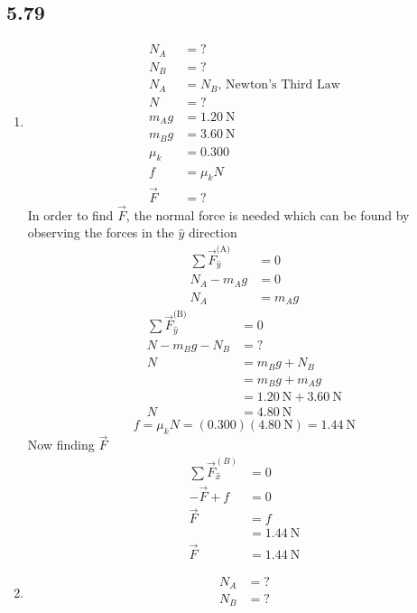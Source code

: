 \documentclass{article}
\begin{document}
\subsection{5.79}
\begin{enumerate}[label=\textbf{(\alph*)}]
	\item
		\begin{align*}
			N_A & = ? \\
			N_B & = ? \\
			N_A & = N_B \text{, Newton's Third Law} \\
			N & = ? \\
			m_Ag & = \SI{1.20}{\newton} \\
			m_Bg & = \SI{3.60}{\newton} \\
			\mu_k & = 0.300 \\
			f & = \mu_kN \\
			\vec{F} & = ?
		\end{align*}
		In order to find $ \vec{F} $, the normal force is needed which can be found by observing the forces in the $ \hat{y} $ direction
		\begin{align*}
			\sum \vec{F}_{\hat{y}}^\text{(A)} & = 0 \\
			N_A - m_Ag & = 0 \\
			N_A & = m_Ag
		\end{align*}
		\begin{align*}
			\sum \vec{F}_{\hat{y}}^\text{(B)} & = 0 \\
			N - m_Bg - N_B & = ? \\
			N & = m_Bg + N_B \\
			  & = m_Bg + m_Ag \\
			  & = \SI{1.20}{\newton} + \SI{3.60}{\newton} \\
			N & = \SI{4.80}{\newton}
		\end{align*}
		$$ f = \mu_kN = (0.300)(\SI{4.80}{\newton}) = \SI{1.44}{\newton} $$
		Now finding $ \vec{F} $
		\begin{align*}
			\sum \vec{F}_{\hat{x}}^{(B)} & = 0 \\
			-\vec{F} + f & = 0 \\
			\vec{F} & = f \\
					& = \SI{1.44}{\newton} \\
			\vec{F} & = \SI{1.44}{\newton}
		\end{align*}
	\item
		\begin{align*}
			N_A & = ? \\
			N_B & = ? \\

\end{align*}
\end{enumerate}
\end{document}
